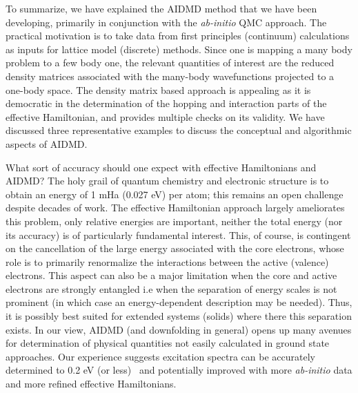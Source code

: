\documentclass[prl,12pt,onecolumn,nofootinbib,notitlepage,english,superscriptaddress]{revtex4-1}
\begin{document}
To summarize, we have explained the AIDMD method that we have been developing, primarily in conjunction with the 
\emph{ab-initio} QMC approach. The practical motivation is to take data from first principles (continuum) 
calculations as inputs for lattice model (discrete) methods. 
Since one is mapping a many body problem to a few body one, the relevant quantities of interest are 
the reduced density matrices associated with the many-body wavefunctions projected to a one-body space. 
The density matrix based approach is appealing as it is democratic 
in the determination of the hopping and interaction parts of the effective Hamiltonian, and provides multiple 
checks on its validity. We have discussed three representative examples to discuss the conceptual and algorithmic aspects of AIDMD. 

What sort of accuracy should one expect with effective Hamiltonians and AIDMD? The holy grail of quantum chemistry 
and electronic structure is to obtain an energy of 1 mHa (0.027 eV) per atom; this 
remains an open challenge despite decades of work. The effective Hamiltonian approach largely ameliorates this problem,  only 
relative energies are important, neither the total energy (nor its accuracy) is of particularly 
fundamental interest. This, of course, is contingent on the cancellation of the large energy associated with the core electrons, 
whose role is to primarily renormalize the interactions between the active (valence) electrons. This aspect can also 
be a major limitation when the core and active electrons are strongly entangled i.e when the separation of energy 
scales is not prominent (in which case an energy-dependent description may be needed). 
Thus, it is possibly best suited for extended systems (solids) where there this separation exists. 
In our view, AIDMD (and downfolding in general) opens up many avenues for determination of physical 
quantities not easily calculated in ground state approaches. Our experience suggests excitation spectra 
can be accurately determined to 0.2 eV (or less)~\cite{Changlani2015} and potentially improved with 
more \emph{ab-initio} data and more refined effective Hamiltonians.  
\end{document}
